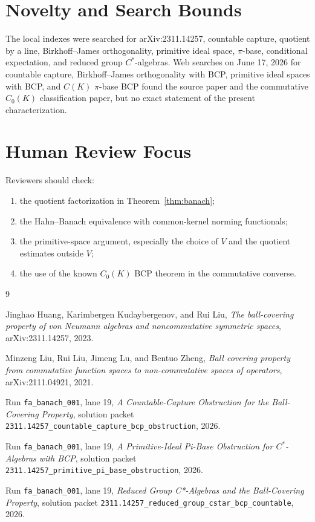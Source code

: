 \documentclass[11pt]{article}
\begin{document}
\section*{Novelty and Search Bounds}

The local indexes were searched for arXiv:2311.14257, countable capture,
quotient by a line, Birkhoff--James orthogonality, primitive ideal space,
\(\pi\)-base, conditional expectation, and reduced group \(C^*\)-algebras.
Web searches on June 17, 2026 for countable capture, Birkhoff--James
orthogonality with BCP, primitive ideal spaces with BCP, and \(C(K)\)
\(\pi\)-base BCP found the source paper and the commutative \(C_0(K)\)
classification paper, but no exact statement of the present characterization.

\section*{Human Review Focus}

Reviewers should check:
\begin{enumerate}
    \item the quotient factorization in Theorem~\ref{thm:banach};
    \item the Hahn--Banach equivalence with common-kernel norming
          functionals;
    \item the primitive-space argument, especially the choice of \(V\) and
          the quotient estimates outside \(V\);
    \item the use of the known \(C_0(K)\) BCP theorem in the commutative
          converse.
\end{enumerate}

\begin{thebibliography}{9}

Jinghao Huang, Karimbergen Kudaybergenov, and Rui Liu,
\emph{The ball-covering property of von Neumann algebras and noncommutative
symmetric spaces},
arXiv:2311.14257, 2023.

Minzeng Liu, Rui Liu, Jimeng Lu, and Bentuo Zheng,
\emph{Ball covering property from commutative function spaces to
non-commutative spaces of operators},
arXiv:2111.04921, 2021.

Run \texttt{fa\_banach\_001}, lane 19,
\emph{A Countable-Capture Obstruction for the Ball-Covering Property},
solution packet
\texttt{2311.14257\_countable\_capture\_bcp\_obstruction}, 2026.

Run \texttt{fa\_banach\_001}, lane 19,
\emph{A Primitive-Ideal Pi-Base Obstruction for \(C^*\)-Algebras with BCP},
solution packet
\texttt{2311.14257\_primitive\_pi\_base\_obstruction}, 2026.

Run \texttt{fa\_banach\_001}, lane 19,
\emph{Reduced Group C*-Algebras and the Ball-Covering Property},
solution packet
\texttt{2311.14257\_reduced\_group\_cstar\_bcp\_countable}, 2026.

\end{thebibliography}
\end{document}
